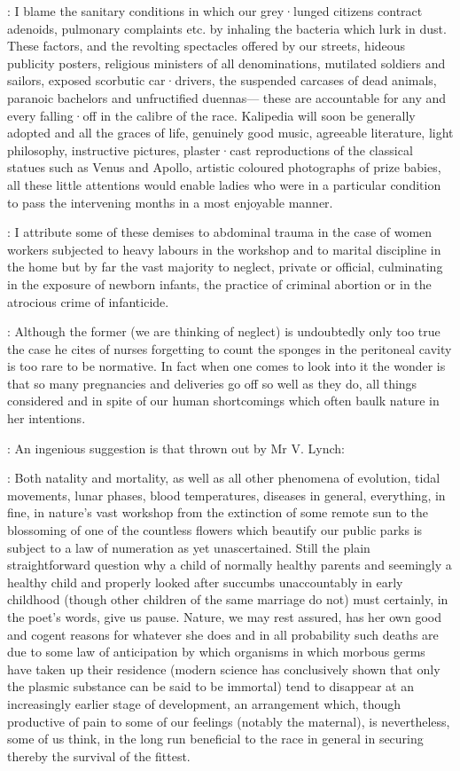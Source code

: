 \mulligan:
I blame the sanitary conditions in which our grey·lunged citizens
contract adenoids,
pulmonary complaints etc.
by inhaling the bacteria
which lurk in dust.
These factors,
and the revolting spectacles offered by
our streets,
hideous publicity posters,
religious ministers of all
denominations,
mutilated soldiers and sailors,
exposed scorbutic
car·drivers,
the suspended carcases of dead animals,
paranoic bachelors and
unfructified duennas---%
these are accountable
for any and every falling·off in the calibre of the race.
Kalipedia will soon be generally adopted and
all the graces of life,
genuinely good music,
agreeable literature,
light
philosophy,
instructive pictures,
plaster·cast reproductions of the
classical statues such as Venus and Apollo,
artistic coloured photographs
of prize babies,
all these little attentions would enable ladies who were
in a particular condition to pass the intervening months in a most
enjoyable manner.

\crotthers:
I attribute some of these demises to abdominal trauma in the case
of women workers subjected to heavy labours in the workshop and to
marital discipline in the home but by far the vast majority to neglect,
private or official,
culminating in the exposure of newborn infants,
the practice of criminal abortion or in the atrocious crime of infanticide.

:
Although the former
(we are thinking of neglect)
is undoubtedly only too
true the case he cites of nurses forgetting to count the sponges in the
peritoneal cavity is too rare to be normative.
In fact when one comes to
look into it the wonder is that so many pregnancies and deliveries go off
so well as they do,
all things considered and in spite of our human
shortcomings which often baulk nature in her intentions.

:
An ingenious suggestion is that thrown out by Mr V. Lynch:

\lynch:
Both natality and mortality,
as well as all other phenomena of evolution,
tidal movements,
lunar phases,
blood temperatures,
diseases in general,
everything,
in fine,
in nature's vast workshop from the extinction of
some remote sun to the blossoming of one of the countless flowers which
beautify our public parks is subject to a law of numeration as yet
unascertained.
Still the plain straightforward question why a child of
normally healthy parents and seemingly a healthy child and properly
looked after succumbs unaccountably in early childhood
(though other children of the same marriage do not)
must certainly,
in the poet's words,
give us pause.
Nature,
we may rest assured,
has her own good and cogent reasons for whatever she does and in all probability such deaths are due to some law of anticipation by which organisms in which morbous germs have taken up their residence
(modern science has conclusively shown that only the plasmic substance can be said to be immortal)
tend to disappear at an increasingly earlier stage of development,
an arrangement which,
though productive of pain to some of our feelings
(notably the maternal),
is nevertheless,
some of us think,
in the long run beneficial
to the race in general in securing thereby the survival of the fittest.

